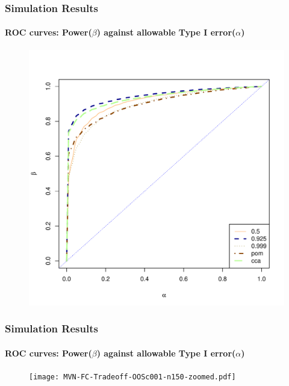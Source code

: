 \documentclass{beamer}
\begin{document}
\begin{frame}
  \frametitle{Simulation Results}
    \framesubtitle{ROC curves: Power($\beta$) against allowable Type I error($\alpha$)}

  \begin{center}
  \begin{figure}
  \includegraphics[scale=0.45]{MVN-FC-Tradeoff-OOSc001-n150.pdf} 
 
    
  \end{figure} 
  \end{center}

\end{frame}
\begin{frame}
  \frametitle{Simulation Results}
  \framesubtitle{ROC curves: Power($\beta$) against allowable Type I error($\alpha$)}

  \begin{center}
  \begin{figure}
  	
   \texttt{[image: MVN-FC-Tradeoff-OOSc001-n150-zoomed.pdf]}
    
  \end{figure} 
  \end{center}

\end{frame}
\end{document}
